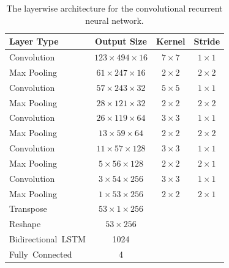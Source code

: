     
  \begin{table}[]
  \centering
  \begin{tabularx}{\textwidth}{Xccc}
  \toprule
Layer Type                                          & Output Size    & Kernel & Stride  \\ \midrule
Convolution               & $123\times494\times16$  & $7\times7$    & $1\times1$    \\ 
Max Pooling               & $61\times247\times16$   & $2\times2$    & $2\times2$    \\ 
Convolution               & $57\times243\times32$   & $5\times5$    & $1\times1$    \\ 
Max Pooling               & $28\times121\times32$   & $2\times2$    & $2\times2$    \\ 
Convolution               & $26\times119\times64$   & $3\times3$    & $1\times1$    \\ 
Max Pooling               & $13\times59\times64$    & $2\times2$    & $2\times2$    \\ 
Convolution               & $11\times57\times128$   & $3\times3$    & $1\times1$    \\ 
Max Pooling               & $5\times56\times128$    & $2\times2$    & $2\times1$    \\ 
Convolution               & $3\times54\times256$    & $3\times3$    & $1\times1$    \\ 
Max Pooling               & $1\times53\times256$    & $2\times2$    & $2\times1$    \\ 
Transpose                 & $53\times1\times256$    &        &         \\
Reshape                   & $53\times256$           &        &         \\
\mbox{Bidirectional LSTM} & 1024                    &        &         \\
\mbox{Fully Connected}    & 4                       &        &         \\
  \bottomrule
  \end{tabularx}
  \caption{The layerwise architecture for the convolutional recurrent neural network.}
  \label{tab:layers_CRNN}
  \end{table}
  
  
